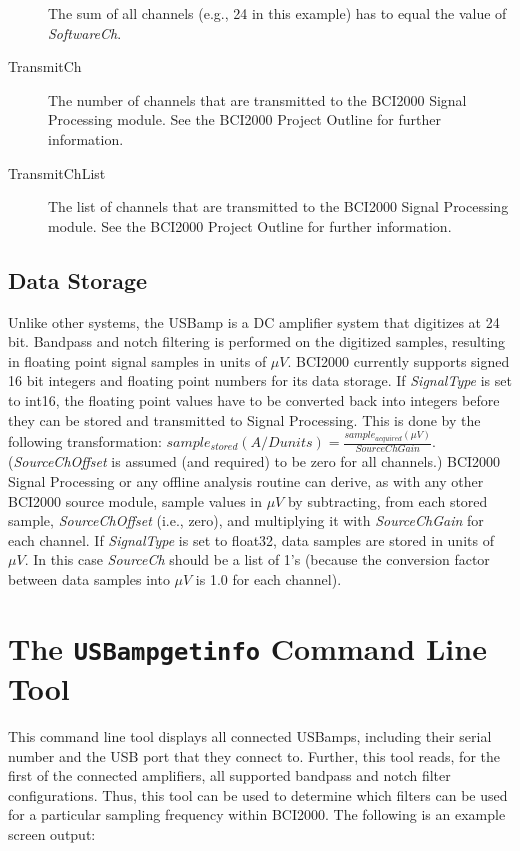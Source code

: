 \documentclass[letterpaper, oneside, 12pt]{article}
\begin{document}
\begin{description}
                           The sum of all channels (e.g., 24 in this example) has to 
                           equal the value of \textit{SoftwareCh}.
 \item [TransmitCh]        The number of channels that are transmitted to the BCI2000 
                           Signal Processing module. See the BCI2000 Project
                           Outline for further information.
 \item [TransmitChList]    The list of channels that are transmitted to the BCI2000 
                           Signal Processing module. See the BCI2000 Project
                           Outline for further information.                                                                        
\end{description}


\subsection{Data Storage}

Unlike other systems, the USBamp is a DC amplifier system that digitizes at 24 
bit. Bandpass and notch filtering is performed on the digitized samples, 
resulting in floating point signal samples in units of $\mu V$. BCI2000 
currently supports signed 16 bit integers and floating point numbers for its data storage.
If \emph{SignalType} is set to int16, the floating point values have 
to be converted back into integers before they can be stored and transmitted to 
Signal Processing. This is done by the following transformation: 
$sample_{stored}(A/D units)=\frac{sample_{acquired}(\mu V)}{SourceChGain}$. 
(\emph{SourceChOffset} is assumed (and required) to be zero for all channels.) 
BCI2000 Signal Processing or any offline analysis routine can derive, as with 
any other BCI2000 source module, sample values in $\mu V$ by subtracting, from 
each stored sample, \emph{SourceChOffset} (i.e., zero), and multiplying it with 
\emph{SourceChGain} for each channel. If \emph{SignalType} is set to float32,
data samples are stored in units of $\mu V$. In this case \emph{SourceCh} should be
a list of 1's (because the conversion factor between data samples into $\mu V$ is
1.0 for each channel).

\section{The \texttt{USBampgetinfo} Command Line Tool}

This command line tool displays all connected USBamps, including their serial 
number and the USB port that they connect to. Further, this tool reads, for the 
first of the connected amplifiers, all supported bandpass and notch filter 
configurations. Thus, this tool can be used to determine which filters can be 
used for a particular sampling frequency within BCI2000. The following is an 
example screen output:
\end{document}
